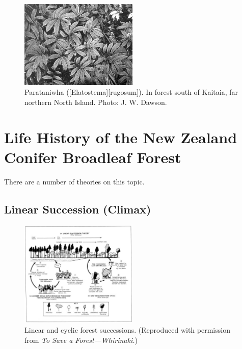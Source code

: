 \begin{figure}
	\includegraphics[width=0.5\textwidth]{graphics/figure63parataniwha.jpg}
	\centering
	\caption[Parataniwha]{Parataniwha ([Elatostema][rugosum]).
In forest south of Kaitaia, far northern North Island.
	Photo: J. W. Dawson.}%
	\label{fig:63parataniwha}
\end{figure}

\section{Life History of the New Zealand Conifer Broadleaf Forest}

There are a number of theories on this topic.

\subsection[Linear Succession (Climax)]{Linear Succession (Climax)}

\begin{figure}
	\includegraphics[width=0.5\textwidth]{graphics/figure64forestsuccession.jpg}
	\centering
	\caption[Linear and cyclic forest successions]{Linear and cyclic forest successions. (Reproduced with permission from \emph{To Save a Forest---Whirinaki.})}%
	\label{fig:64forestsuccession}
\end{figure}

